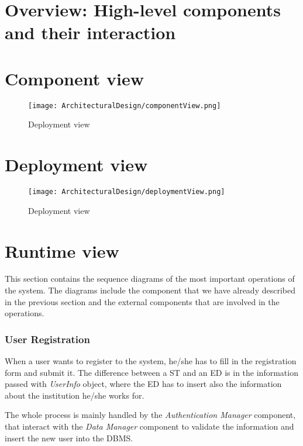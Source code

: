 \section{Overview: High-level components and their interaction}
\label{s:overview}%

\section{Component view}
\label{s:component-view}%

\begin{figure}[H]
    \label{fig:deployment-view}
    \centering
    \texttt{[image: ArchitecturalDesign/componentView.png]}
    \caption{Deployment view}
\end{figure}
\newpage

\section{Deployment view}
\label{s:deployment-view}%

\begin{figure}[H]
    \label{fig:deployment-view}
    \centering
    \texttt{[image: ArchitecturalDesign/deploymentView.png]}
    \caption{Deployment view}
\end{figure}
\newpage

\section{Runtime view}
\label{s:runtime-view}%
This section contains the sequence diagrams of the most important operations of the system. The diagrams include the component that we have already described in the previous section and the external components that are involved in the operations.

\subsubsection*{User Registration}
\label{ss:registration_diagram}%
When a user wants to register to the system, he/she has to fill in the registration form and submit it. The difference between a ST and an ED is in the information passed with \textit{UserInfo} object, where the ED has to insert also the information about the institution he/she works for.

The whole process is mainly handled by the \textit{Authentication Manager} component, that interact with the \textit{Data Manager} component to validate the information and insert the new user into the DBMS.

